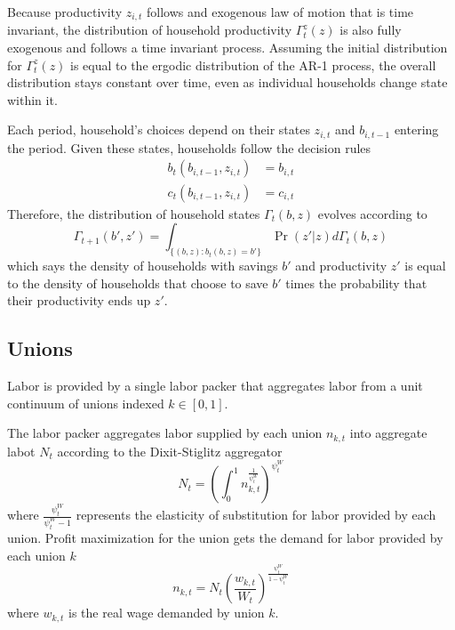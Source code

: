 Because productivity $z_{i, t}$ follows and exogenous law of motion that is time invariant, the distribution of household productivity $\Gamma_t^z (z)$ is also fully exogenous and follows a time invariant process. Assuming the initial distribution for $\Gamma_t^z (z)$ is equal to the ergodic distribution of the AR-1 process, the overall distribution stays constant over time, even as individual households change state within it.

Each period, household's choices depend on their states $z_{i, t}$ and $b_{i, t - 1}$ entering the period. Given these states, households follow the decision rules
\begin{align*}
    b_t (b_{i, t-1}, z_{i, t}) &= b_{i, t} \\
    c_t (b_{i, t-1}, z_{i, t}) &= c_{i, t}
\end{align*}
Therefore, the distribution of household states $\Gamma_t (b, z)$ evolves according to
\begin{equation*}
    \Gamma_{t + 1} (b', z') = \int_{\{(b, z) : b_t(b, z) = b'\}} \Pr (z' | z) d \Gamma_t (b, z)
\end{equation*}
which says the density of households with savings $b'$ and productivity $z'$ is equal to the density of households that choose to save $b'$ times the probability that their productivity ends up $z'$.


\subsection{Unions} \label{subsec:unions}

Labor is provided by a single labor packer that aggregates labor from a unit continuum of unions indexed $k \in [0, 1]$.

The labor packer aggregates labor supplied by each union $n_{k,t}$ into aggregate labot $N_t$ according to the Dixit-Stiglitz aggregator
\begin{equation*}
    N_t = \left(\int_0^1 n_{k, t}^\frac{1}{\psi_t^W}\right)^{\psi_t^W}
\end{equation*}
where $\frac{\psi_t^W}{\psi_t^W - 1}$ represents the elasticity of substitution for labor provided by each union. Profit maximization for the union gets the demand for labor provided by each union $k$
\begin{equation*}
    n_{k, t} = N_t \left(\frac{w_{k, t}}{W_t}\right)^\frac{\psi_t^W}{1 - \psi_t^W}
\end{equation*}
where $w_{k, t}$ is the real wage demanded by union $k$.

